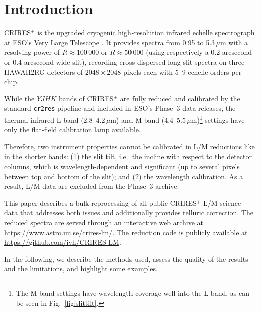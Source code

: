 \documentclass{aa}
\newcommand{\crires}{CRIRES$^+$}
\newcommand{\um}{$\mu$m}
\newcommand{\crtwores}{\texttt{cr2res}}
\begin{document}

\maketitle

\section{Introduction}
\label{sec:intro}

\crires{} is the upgraded cryogenic high-resolution infrared echelle
spectrograph at ESO's Very Large Telescope \citep{Dorn2023}. It provides
spectra from 0.95 to 5.3\,\um{} with a
resolving power of $R \approx 100\,000$ or $R \approx 50\,000$ (using respectively 
a 0.2 arcsecond or 0.4 arcsecond wide slit), recording cross-dispersed long-slit
spectra on three HAWAII2RG detectors of $2048 \times 2048$ pixels each 
with 5--9 echelle orders per chip.

While the $YJHK$ bands of \crires{} are fully reduced and calibrated by
the standard \crtwores{} pipeline \citep{cr2res} and included in ESO's
Phase~3 data releases, the thermal infrared L-band (2.8--4.2\,\um) and
M-band (4.4--5.5\,\um)\footnote{The M-band settings have wavelength coverage
 well into the L-band, as can be seen in Fig.~\ref{fig:slittilt}.}
 settings have only the flat-field calibration lamp
available.

Therefore, two instrument properties cannot be calibrated in
L/M reductions like in the shorter bands: (1) the slit tilt, i.e.~the incline with respect to
the detector columns, which is 
wavelength-dependent and significant (up to several pixels between top and bottom
of the slit); and (2) the wavelength calibration.
As a result, L/M data are excluded from the Phase~3
archive. 

This paper describes a bulk reprocessing of all public \crires{} L/M
science data that addresses both issues and additionally provides telluric
correction. The reduced spectra are served through an interactive web
archive at \url{https://www.astro.uu.se/crires-lm/}. The reduction
code is publicly available at
\url{https://github.com/ivh/CRIRES-LM}.

In the following, we describe the methods used, assess the quality of the results
and the limitations, and highlight some examples.
\end{document}
